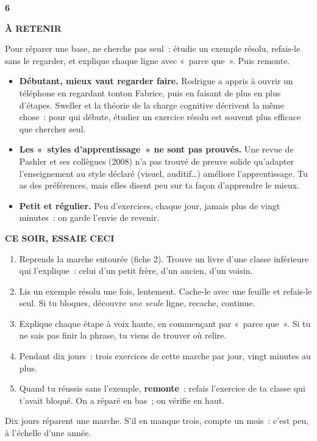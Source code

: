 \documentclass[10pt,twoside,openany]{book}
\newenvironment{aretenir}[1][À retenir]{\par\begin{tcolorbox}[enhanced,colback=creme,colframe=accent,boxrule=0pt,leftrule=3pt,arc=0pt,left=8pt,right=8pt,top=5pt,bottom=5pt,breakable]{\small\bfseries\color{accent}\MakeUppercase{#1}}\par\smallskip}{\end{tcolorbox}\par}
\newenvironment{cesoir}[1][Ce soir, essaie ceci]{\par\begin{tcolorbox}[enhanced,colback=white,colframe=vert,boxrule=0.6pt,arc=2pt,left=8pt,right=8pt,top=5pt,bottom=5pt,breakable]{\small\bfseries\color{vert}\MakeUppercase{#1}}\par\smallskip\small}{\end{tcolorbox}\par}
\newcommand{\fiche}[3]{\clearpage\markright{#2}\thispagestyle{plain}%
 {\noindent\color{accent}\fontsize{40}{40}\selectfont\bfseries #1}\hspace{0.6em}{\Large\bfseries #2\par}\vspace{0.1em}{\small\color{gris}\itshape #3\par}\vspace{0.5em}}
\begin{document}
\fiche{6}{Redescendre}{Chapitre 6 du livre}
\begin{aretenir}
Pour réparer une base, ne cherche pas seul : étudie un exemple résolu, refais-le sans le regarder, et explique chaque ligne avec « parce que ». Puis remonte.
\end{aretenir}
\begin{itemize}
\item \textbf{Débutant, mieux vaut regarder faire.} Rodrigue a appris à ouvrir un téléphone en regardant tonton Fabrice, puis en faisant de plus en plus d’étapes. Sweller et la théorie de la charge cognitive décrivent la même chose : pour qui débute, étudier un exercice résolu est souvent plus efficace que chercher seul.
\item \textbf{Les « styles d’apprentissage » ne sont pas prouvés.} Une revue de Pashler et ses collègues (2008) n’a pas trouvé de preuve solide qu’adapter l’enseignement au style déclaré (visuel, auditif…) améliore l’apprentissage. Tu as des préférences, mais elles disent peu sur ta façon d’apprendre le mieux.
\item \textbf{Petit et régulier.} Peu d’exercices, chaque jour, jamais plus de vingt minutes : on garde l’envie de revenir.
\end{itemize}
\begin{cesoir}
\begin{enumerate}
\item Reprends la marche entourée (fiche 2). Trouve un livre d’une classe inférieure qui l’explique : celui d’un petit frère, d’un ancien, d’un voisin.
\item Lis un exemple résolu une fois, lentement. Cache-le avec une feuille et refais-le seul. Si tu bloques, découvre \emph{une seule} ligne, recache, continue.
\item Explique chaque étape à voix haute, en commençant par « parce que ». Si tu ne sais pas finir la phrase, tu viens de trouver où relire.
\item Pendant dix jours : trois exercices de cette marche par jour, vingt minutes au plus.
\item Quand tu réussis sans l’exemple, \textbf{remonte} : refais l’exercice de ta classe qui t’avait bloqué. On a réparé en bas ; on vérifie en haut.
\end{enumerate}
Dix jours réparent une marche. S’il en manque trois, compte un mois : c’est peu, à l’échelle d’une année.
\end{cesoir}
\end{document}
